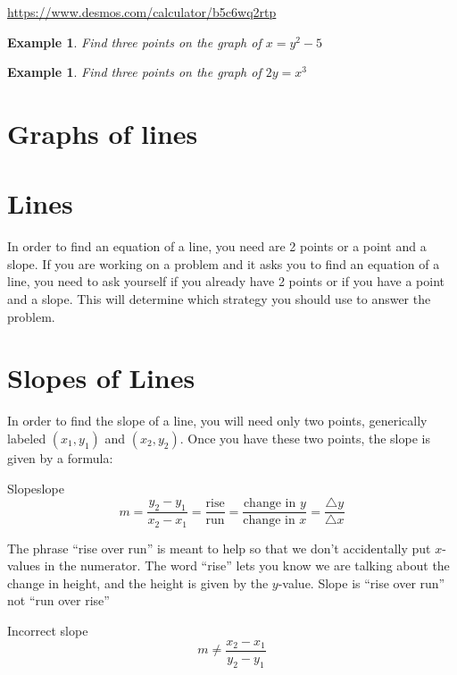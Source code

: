 \documentclass[twoside]{tufte-handout}
\newcommand{\booksection}{0}
\newcommand{\pageheader}{}
\newcounter{ekcounter}%
\theoremstyle{ekimcustom}
\newtheorem{exm}[ekcounter]{Example}
\begin{document}

\hskip10pt
\url{https://www.desmos.com/calculator/b5c6wq2rtp}

\begin{exm}
Find three points on the graph of $x=y^2-5$
\end{exm}
\vskip10pt
\begin{exm}
Find three points on the graph of $2y=x^3$
\end{exm}
\vskip10pt


\renewcommand{\booksection}{Graphs of lines}
\renewcommand{\pageheader}{\booksection }
\section*{\LARGE \pageheader}

%
%
%



\section{Lines}

In order to find an equation of a line, you need are 2 points or a point and a slope. If you are working on a problem and it asks you to find an equation of a line, you need to ask yourself if you already have 2 points or if you have a point and a slope. This will determine which strategy you should use to answer the problem. 

\section{Slopes of Lines}
In order to find the slope of a line, you will need only two points, generically labeled $(x_1,y_1)$ and $(x_2,y_2)$. Once you have these two points, the slope is given by a formula:
\begin{bdefinition}{Slope}{slope}
$$m=\frac{y_2-y_1}{x_2-x_1} = \frac{\text{rise}}{\text{run}} = \frac{\text{change in $y$}}{\text{change in $x$}} = \frac{\triangle y}{\triangle x}$$
\end{bdefinition}
The phrase ``rise over run'' is meant to help so that we don't accidentally put $x$-values in the numerator. The word ``rise'' lets you know we are talking about the change in height, and the height is given by the $y$-value. Slope is ``rise over run'' not ``run over rise''
\begin{bwarning}{Incorrect slope}{}
$$m \not= \frac{x_2-x_1}{y_2-y_1}$$
\end{bwarning}
\end{document}
